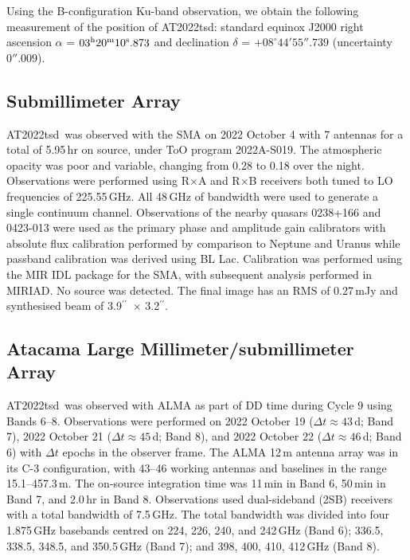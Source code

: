 \documentclass{nature_plusfigure}
\newcommand{\at}{AT2022tsd}
\newcommand{\arcsec}{$^{\prime\prime}$}
\begin{document}
\begin{methods}
Using the B-configuration Ku-band observation, we obtain the following measurement of the position of \at:
standard equinox J2000 right ascension $\alpha$ =
$03^{\rm{h}}20^{\rm{m}}10^{\rm{s}}.873$
and declination $\delta$ = $+08^{\circ} 44' 55''.739$ 
(uncertainty $0''.009$).

\subsection{Submillimeter Array}
\label{Methods:SMA}

\at\ was observed with the SMA on 2022 October 4 with 7 antennas for a total of 5.95\,hr on source, under ToO program 2022A-S019. The atmospheric opacity was poor and variable, changing from 0.28 to 0.18 over the night. Observations were performed using R$\times$A and R$\times$B receivers both tuned to LO frequencies of 225.55\,GHz. All 48\,GHz of bandwidth were used to generate a single continuum channel. Observations of the nearby quasars 0238+166 and 0423-013 were used as the primary phase and amplitude gain calibrators with absolute flux calibration performed by comparison to Neptune and Uranus while passband calibration was derived using BL Lac. Calibration was performed using the MIR IDL package for the SMA, with subsequent analysis performed in MIRIAD. No source was detected. The final image has an RMS of 0.27\,mJy and synthesised beam of 3.9\arcsec\ $\times$ 3.2\arcsec.

\subsection{Atacama Large Millimeter/submillimeter Array}
\label{sec:ALMA}

\at\ was observed with ALMA as part of DD time during Cycle 9 using Bands 6--8. Observations were performed on 2022 October 19 ($\Delta t \approx 43$\,d; Band 7), 2022 October 21 ($\Delta t \approx 45$\,d; Band 8), and 2022 October 22 ($\Delta t \approx 46$\,d; Band 6) with $\Delta t$ epochs in the observer frame. The ALMA 12\,m antenna array was in its C-3 configuration, with
43--46 working antennas and baselines in the range 15.1--457.3\,m. The on-source integration time was
11\,min in Band 6, 50\,min in Band 7, and 2.0\,hr in Band 8.
Observations used dual-sideband (2SB) receivers with a total bandwidth of 7.5\,GHz. The total bandwidth was divided into four 1.875\,GHz basebands centred on 224, 226, 240, and 242\,GHz (Band 6);
336.5, 338.5, 348.5, and 350.5\,GHz (Band 7);
and 398, 400, 410, 412\,GHz (Band 8).


\end{methods}
\end{document}
